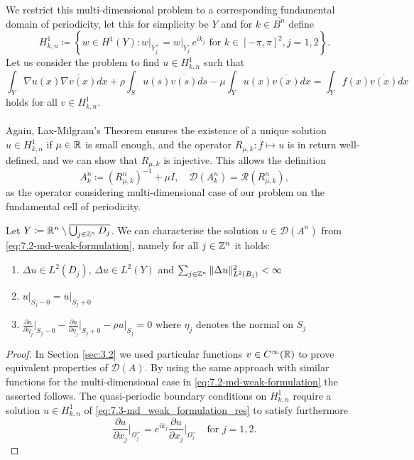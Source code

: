 We restrict this multi-dimensional problem to a corresponding fundamental domain of periodicity, let this for simplicity be $Y$ and for $k \in \overline{B^{n}}$ define 
\[ H^{1}_{k, n} \coloneqq \left\{ w \in H^{1}(Y) \colon w \big|_{Y_{j}^{+}} = w \big|_{Y_{j}^{-}} e^{i k_{j}} \text{ for } k \in [-\pi, \pi]^{2}, j = 1,2 \right\}. \]
 Let us consider the problem to find $u \in H^{1}_{k, n}$ such that
	\begin{equation}
		\int_{Y} \nabla u(x) \overline{\nabla v(x)} dx + \rho \int_{S} u(s) \overline{v(s)} ds - \mu \int_{Y} u(x) \overline{v(x)} dx = \int_{Y} f(x) \overline{v(x)} dx \label{eq:7.3-md_weak_formulation_res}
	\end{equation} 
holds for all $v \in H^{1}_{k, n}$. 
~\\ ~\\
Again, Lax-Milgram's Theorem ensures the existence of a unique solution $u \in H^{1}_{k, n}$ if $\mu \in \mathbb{R}$ is small enough, and the operator $R_{\mu, k} \colon f \mapsto u$ is in return well-defined, and we can show that $R_{\mu, k}$ is injective. This allows the definition 
	\[ A_{k}^{n} \coloneqq \left(R_{\mu, k}^{n}\right)^{-1} + \mu I, \quad \mathcal{D}(A_{k}^{n}) = \mathcal{R}(R_{\mu, k}^{n}), \]
as the operator considering multi-dimensional case of our problem on the fundamental cell of periodicity.
\begin{theorem} Let $Y \coloneqq \mathbb{R}^{n} \setminus \overline{\bigcup_{j \in \mathbb{Z}^{n}} D_{j}}$. We can characterise the solution $u \in \mathcal{D}(A^{n})$ from \eqref{eq:7.2-md-weak-formulation}, namely for all $j \in \mathbb{Z}^{n}$ it holds:
	\begin{enumerate} %
		\item $\Delta u \in L^{2}(D_{j})$, $\Delta u \in L^{2}(Y)$ and $\sum_{j \in \mathbb{Z}^{n}} \|\Delta u \|_{L^{2}(B_{j})}^{2} < \infty$
		\item $u \big|_{S_{j} - 0} = u \big|_{S_{j} + 0}$
		\item $\frac{\partial u}{\partial \eta_{j}} \big|_{S_{j} - 0} - \frac{\partial u}{\partial \eta_{j}} \big|_{S_{j} + 0} - \rho u \big|_{S_{j}} = 0$ where $\eta_{j}$ denotes the normal on $S_{j}$
	\end{enumerate}
\end{theorem}
	
\begin{proof} %
 	In Section \ref{sec:3.2} we used particular functions $v \in C^{\infty}(\mathbb{R})$ to prove equivalent properties of $\mathcal{D}(A)$. By using the same approach with similar functions for the multi-dimensional case in \eqref{eq:7.2-md-weak-formulation} the asserted follows. 
	The quasi-periodic boundary conditions on $H^{1}_{k,n}$ require a solution $u \in H^{1}_{k, n}$ of \eqref{eq:7.3-md_weak_formulation_res} to satisfy furthermore
	\[ \frac{\partial u}{\partial x_{j}}\big|_{\Omega_{j}^{+}} = e^{ik_{j}} \frac{\partial u}{\partial x_{j}}\big|_{\Omega_{j}^{-}} \quad \text{for } j = 1, 2.  \]	
\end{proof} \vspace{-0.75cm}

